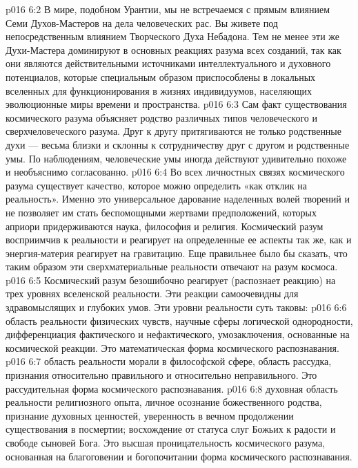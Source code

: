\vs p016 6:2 В мире, подобном Урантии, мы не встречаемся с прямым влиянием Семи Духов\hyp{}Мастеров на дела человеческих рас. Вы живете под непосредственным влиянием Творческого Духа Небадона. Тем не менее эти же Духи\hyp{}Мастера доминируют в основных реакциях разума всех созданий, так как они являются действительными источниками интеллектуального и духовного потенциалов, которые специальным образом приспособлены в локальных вселенных для функционирования в жизнях индивидуумов, населяющих эволюционные миры времени и пространства.
\vs p016 6:3 Сам факт существования космического разума объясняет родство различных типов человеческого и сверхчеловеческого разума. Друг к другу притягиваются не только родственные духи --- весьма близки и склонны к сотрудничеству друг с другом и родственные умы. По наблюдениям, человеческие умы иногда действуют удивительно похоже и необъяснимо согласованно.
\vs p016 6:4 \pc Во всех личностных связях космического разума существует качество, которое можно определить «как отклик на реальность». Именно это универсальное дарование наделенных волей творений и не позволяет им стать беспомощными жертвами предположений, которых априори придерживаются наука, философия и религия. Космический разум восприимчив к реальности и реагирует на определенные ее аспекты так же, как и энергия\hyp{}материя реагирует на гравитацию. Еще правильнее было бы сказать, что таким образом эти сверхматериальные реальности отвечают на разум космоса.
\vs p016 6:5 Космический разум безошибочно реагирует (распознает реакцию) на трех уровнях вселенской реальности. Эти реакции самоочевидны для здравомыслящих и глубоких умов. Эти уровни реальности суть таковы:
\vs p016 6:6 \bibnobreakspace {} область реальности физических чувств, научные сферы логической однородности, дифференциация фактического и нефактического, умозаключения, основанные на космической реакции. Это математическая форма космического распознавания.
\vs p016 6:7 \bibnobreakspace {} область реальности морали в философской сфере, область рассудка, признания относительно правильного и относительно неправильного. Это рассудительная форма космического распознавания.
\vs p016 6:8 \bibnobreakspace {} духовная область реальности религиозного опыта, личное осознание божественного родства, признание духовных ценностей, уверенность в вечном продолжении существования в посмертии; восхождение от статуса слуг Божьих к радости и свободе сыновей Бога. Это высшая проницательность космического разума, основанная на благоговении и богопочитании форма космического распознавания.
